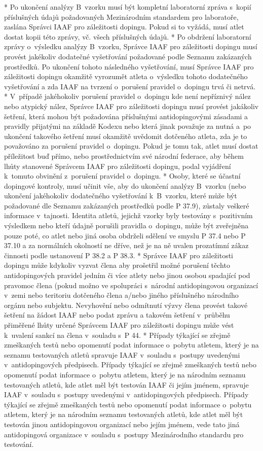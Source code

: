 * Po ukončení analýzy B~vzorku musí být kompletní laboratorní zpráva s~kopií příslušných údajů požadovaných Mezinárodním standardem pro laboratoře, zaslána Správci IAAF pro záležitosti dopingu. Pokud si to vyžádá, musí atlet dostat kopii této zprávy, vč. všech příslušných údajů.
* Po obdržení laboratorní zprávy o~výsledku analýzy B~vzorku, Správce IAAF pro záležitosti dopingu musí provést jakékoliv dodatečné vyšetřování požadované podle Seznamu zakázaných prostředků. Po ukončení tohoto následného vyšetřování, musí Správce IAAF pro záležitosti dopingu okamžitě vyrozumět atleta o~výsledku tohoto dodatečného vyšetřování a zda IAAF na tvrzení o~porušení pravidel o~dopingu trvá či netrvá.
* V~případě jakéhokoliv porušení pravidel o~dopingu kde není nepříznivý nález nebo atypický nález, Správce IAAF pro záležitosti dopingu musí provést jakákoliv šetření, která mohou být požadována příslušnými antidopingovými zásadami a pravidly přijatými na základě Kodexu nebo která jinak považuje za nutná a~po ukončení takového šetření musí okamžitě uvědomit dotčeného atleta, zda je to považováno za porušení pravidel o~dopingu. Pokud je tomu tak, atlet musí dostat příležitost buď přímo, nebo prostřednictvím své národní federace, aby během lhůty stanovené Správcem IAAF pro záležitosti dopingu, podal vyjádření k~tomuto obvinění z~porušení pravidel o~dopingu.
* Osoby, které se účastní dopingové kontroly, musí učinit vše, aby do ukončení analýzy B~vzorku (nebo ukončení jakéhokoliv dodatečného vyšetřování k~B~vzorku, které může být požadované dle Seznamu zakázaných prostředků podle P 37.9), zůstaly veškeré informace v~tajnosti. Identita atletů, jejichž vzorky byly testovány s~pozitivním výsledkem nebo kteří údajně porušili pravidla o~dopingu, může být zveřejněna pouze poté, co atlet nebo jiná osoba obdrželi sdělení ve smyslu P 37.4 nebo P 37.10 a za normálních okolností ne dříve, než je na ně uvalen prozatímní zákaz činnosti podle ustanovení P 38.2 a P 38.3.
* Správce IAAF pro záležitosti dopingu může kdykoliv vyzvat člena aby prošetřil možné porušení těchto antidopingových pravidel jedním či více atlety nebo jinou osobou spadající pod pravomoc člena (pokud možno ve spolupráci s~národní antidopingovou organizací v~zemi nebo teritoriu dotčeného člena a/nebo jiného příslušného národního orgánu nebo subjektu. Nevyhovění nebo odmítnutí výzvy člena provést takové šetření na žádost IAAF nebo podat zprávu a takovém šetření v~průběhu přiměřené lhůty určené Správcem IAAF pro záležitosti dopingu může vést k~uvalení sankcí na člena v~souladu s~P 44.
* Případy týkající se zřejmě zmeškaných testů nebo opomenutí podat informace o~pobytu atletem, který je na seznamu testovaných atletů spravuje IAAF v~souladu s~postupy uvedenými v~antidopingových předpisech. Případy týkající se zřejmě zmeškaných testů nebo opomenutí podat informace o~pobytu atletem, který je na národním seznamu testovaných atletů, kde atlet měl být testován IAAF či jejím jménem, spravuje IAAF v~souladu s~postupy uvedenými v~antidopingových předpisech. Případy týkající se zřejmě zmeškaných testů nebo opomenutí podat informace o~pobytu atletem, který je na národním seznamu testovaných atletů, kde atlet měl být testován jinou antidopingovou organizací nebo jejím jménem, vede tato jiná antidopingová organizace v~souladu s~postupy Mezinárodního standardu pro testování.
